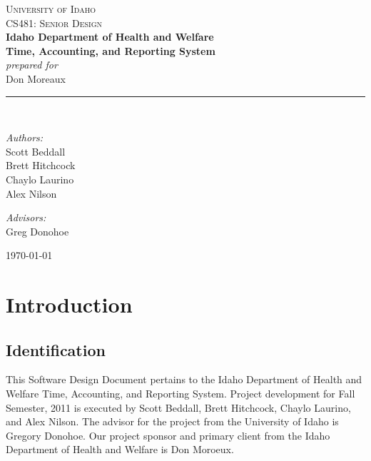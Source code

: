 \documentclass[letterpaper]{article}
\newcommand{\HRule}{\rule{5cm}{0.1mm}}
\begin{document}
\begin{center}



\textsc{\Large University of Idaho}\\[0.2cm]

\textsc{\Large CS481: Senior Design}\\[2cm]


{ \LARGE \bfseries Idaho Department of Health and Welfare}\\[0.4cm]
{ \huge \bfseries Time, Accounting, and Reporting System}\\[1.0cm]
{ \normalsize \emph{ prepared for}}\\[0.5cm]
{ \normalsize Don Moreaux}\\[0.5cm]
\HRule \\[3cm]

\begin{minipage}{0.4\textwidth}
\begin{flushleft} \large
\emph{Authors:}\\
Scott Beddall\\
Brett Hitchcock\\
Chaylo Laurino\\
Alex Nilson
\end{flushleft}
\end{minipage}
\begin{minipage}{0.4\textwidth}
\begin{flushright} \large
\emph{Advisors:} \\
Greg Donohoe\\
\bigskip
\bigskip
\bigskip
\bigskip
\end{flushright}
\end{minipage}

{\large \today}

\end{center}
\pagebreak
\tableofcontents

\pagebreak
\section{\bfseries{Introduction}}
\subsection{\bfseries{Identification}}
This Software Design Document pertains to the Idaho Department of Health and Welfare Time, Accounting, and Reporting System. Project development for Fall Semester, 2011 is executed by Scott Beddall, Brett Hitchcock, Chaylo Laurino, and Alex Nilson. The advisor for the project from the University of Idaho is Gregory Donohoe. Our project sponsor and primary client from the Idaho Department of Health and Welfare is Don Moroeux. 
\end{document}
